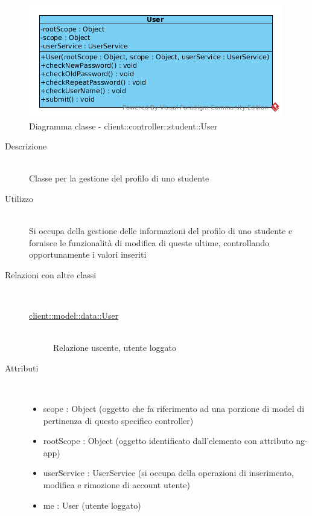 \vspace{0.5cm}
\hypertarget{client::controller::student::User}{}
\begin{center}
			\begin{figure}[H]
				\centering \includegraphics[scale=4, max width=\textwidth, max height=\myheight]{../img/diagrammiClassi/client/controller/student/User.png}
				\caption{Diagramma classe - client::controller::student::User}
			\end{figure}
		\end{center}\begin{description}
\item[Descrizione] \hfill \\
 Classe per la gestione del profilo di uno studente
\item[Utilizzo] \hfill \\
 Si occupa della gestione delle informazioni del profilo di uno studente e fornisce le funzionalità di modifica di queste ultime, controllando opportunamente i valori inseriti
\item[Relazioni con altre classi] \hfill \\
 \vspace{-7mm}
\begin{description}
\item[\hyperlink{client::model::data::User}{client::model::data::User}] \hfill \\
 Relazione uscente, utente loggato
\end{description}

\item[Attributi] \hfill \\
 \vspace{-7mm}
\begin{itemize}
\item scope : Object (oggetto che fa riferimento ad una porzione di model di pertinenza di questo specifico controller)
\item rootScope : Object (oggetto identificato dall’elemento con attributo ng-app)
\item userService : UserService (si occupa della operazioni di inserimento, modifica e rimozione di account utente)
\item me : User  (utente loggato)
\end{itemize}


\end{description}
